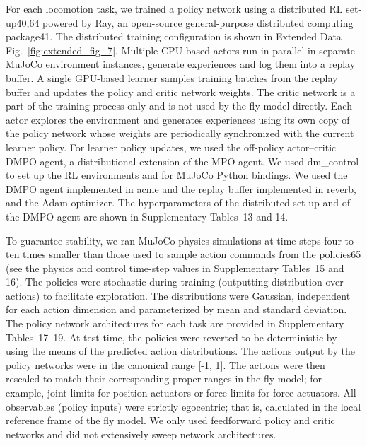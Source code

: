 \documentclass[sn-mathphys-num]{sn-jnl}%
\theoremstyle{thmstyleone}%
\theoremstyle{thmstyletwo}%
\theoremstyle{thmstylethree}%
\begin{document}
For each locomotion task, we trained a policy network using a distributed RL set-up40,64 powered by Ray, an open-source general-purpose distributed computing package41. 
The distributed training configuration is shown in Extended Data Fig.~\ref{fig:extended_fig_7}. 
Multiple CPU-based actors run in parallel in separate MuJoCo environment instances, generate experiences and log them into a replay buffer. 
A single GPU-based learner samples training batches from the replay buffer and updates the policy and critic network weights. 
The critic network is a part of the training process only and is not used by the fly model directly. 
Each actor explores the environment and generates experiences using its own copy of the policy network whose weights are periodically synchronized with the current learner policy. 
For learner policy updates, we used the off-policy actor–critic DMPO agent, a distributional extension\cite{bellemare2017distributional} of the MPO agent\cite{abdolmaleki2018relative,abdolmaleki2018maximum}. 
We used dm\_control\cite{tunyasuvunakool2020dm_control} to set up the RL environments and for MuJoCo Python bindings. 
We used the DMPO agent implemented in acme\cite{hoffman2020acme} and the replay buffer implemented in reverb\cite{cassirer2021reverb}, and the Adam optimizer\cite{kingma2014adam}. 
The hyperparameters of the distributed set-up and of the DMPO agent are shown in Supplementary Tables 13 and 14.


To guarantee stability, we ran MuJoCo physics simulations at time steps four to ten times smaller than those used to sample action commands from the policies65 (see the physics and control time-step values in Supplementary Tables 15 and 16). 
The policies were stochastic during training (outputting distribution over actions) to facilitate exploration. 
The distributions were Gaussian, independent for each action dimension and parameterized by mean and standard deviation. 
The policy network architectures for each task are provided in Supplementary Tables 17–19. 
At test time, the policies were reverted to be deterministic by using the means of the predicted action distributions. 
The actions output by the policy networks were in the canonical range [-1, 1].
The actions were then rescaled to match their corresponding proper ranges in the fly model; 
for example, joint limits for position actuators or force limits for force actuators. 
All observables (policy inputs) were strictly egocentric; 
that is, calculated in the local reference frame of the fly model. 
We only used feedforward policy and critic networks and did not extensively sweep network architectures.
\end{document}
